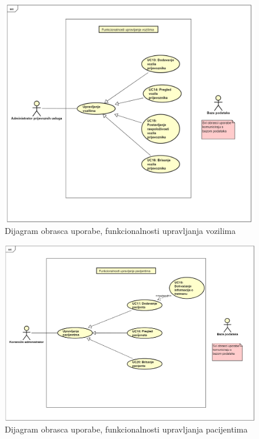 				\begin{figure}[H]
					\centering
					\includegraphics[width=\textwidth]{slike/DOU_FunckionalnostiUpravljanjaVozilima.png} %
					\caption{Dijagram obrasca uporabe, funkcionalnosti upravljanja vozilima}
					\label{fig:funkcionalnosti upravljanja vozilima}
				\end{figure}
				\eject		
				
				\begin{figure}[H]
					\centering
					\includegraphics[width=\textwidth]{slike/DOU_FunckionalnostiUpravljanjaPacijentima.png} %
					\caption{Dijagram obrasca uporabe, funkcionalnosti upravljanja pacijentima}
					\label{fig:funkcionalnosti upravljanja pacijentima}
				\end{figure}
				\eject		
				
